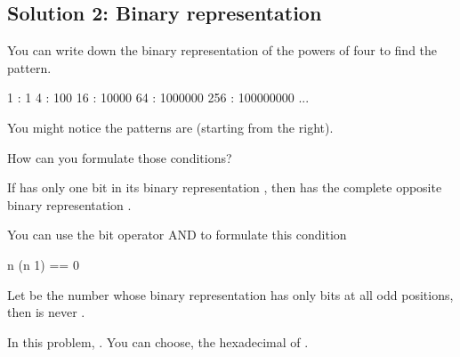 \documentclass[letterpaper,12pt,english]{book}
\begin{document}
\subsection{Solution 2: Binary representation}
\label{\detokenize{Mathematics/09_MTH_342_Power_of_Four:solution-2-binary-representation}}
\sphinxAtStartPar
You can write down the binary representation of the powers of four to find the pattern.

\begin{sphinxVerbatim}[commandchars=\\\{\}]
1   : 1
4   : 100
16  : 10000
64  : 1000000
256 : 100000000
...
\end{sphinxVerbatim}

\sphinxAtStartPar
You might notice the patterns are  (starting from the right).

\sphinxAtStartPar
How can you formulate those conditions?

\sphinxAtStartPar
If  has only one bit  in its binary representation , then  has the complete opposite binary representation .

\sphinxAtStartPar
You can use the bit operator AND to formulate this condition

\begin{sphinxVerbatim}[commandchars=\\\{\}]
n \PYGZam{} (n \PYGZhy{} 1) == 0
\end{sphinxVerbatim}

\sphinxAtStartPar
Let  be the number whose binary representation has only bits  at all odd positions, then  is never .

\sphinxAtStartPar
In this problem, . You can choose, the hexadecimal of .
\end{document}
